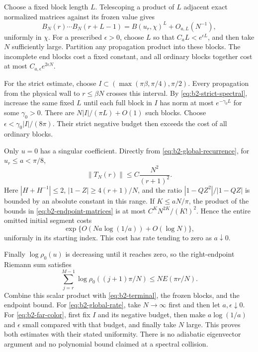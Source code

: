 Choose a fixed block length $L$. Telescoping a product of $L$
adjacent exact normalized matrices against its frozen value gives
\[
 B_N(r)\cdots B_N(r+L-1)
   =B(u_r,\chi)^L+O_{a,L}(N^{-1}),
\]
uniformly in $\chi$. For a prescribed $\epsilon>0$, choose $L$
so that $C_aL<e^{\epsilon L}$, and then take $N$ sufficiently
large. Partition any propagation product into these blocks.
The incomplete end blocks cost a fixed constant, and all ordinary
blocks together cost at most $C_{a,\epsilon}e^{2\epsilon N}$.

For the strict estimate, choose
$I\subset(\max(\pi\beta,\pi/4),\pi/2)$. Every propagation from
the physical wall to $r\le\beta N$ crosses this interval. By
\eqref{eq:b2-strict-spectral}, increase the same fixed $L$ until
each full block in $I$ has norm at most $e^{-\gamma_0L}$ for some
$\gamma_0>0$. There are $N|I|/(\pi L)+O(1)$ such blocks.
Choose $\epsilon<\gamma_0|I|/(8\pi)$. Their strict negative budget
then exceeds the cost of all ordinary blocks.

Only $u=0$ has a singular coefficient. Directly from
\eqref{eq:b2-global-recurrence}, for $u_r\le a<\pi/8$,
\begin{equation}\label{eq:b2-endpoint-matrices}
 \|T_N(r)\|\le C\frac{N^2}{(r+1)^2}.
\end{equation}
Here $|H+H^{-1}|\le2$, $|1-Z|\ge4(r+1)/N$, and the ratio
$|1-QZ^2|/|1-QZ|$ is bounded by an absolute constant in this
range. If $K\le aN/\pi$, the product of the bounds in
\eqref{eq:b2-endpoint-matrices} is at most
$C^KN^{2K}/(K!)^2$. Hence the entire omitted initial segment
costs
\[
 \exp\{O(Na\log(1/a))+O(\log N)\},
\]
uniformly in its starting index. This cost has rate tending to
zero as $a\downarrow0$.

Finally $\log\rho_0(u)$ is decreasing until it reaches zero, so
the right-endpoint Riemann sum satisfies
\begin{equation}\label{eq:b2-Riemann-envelope}
 \sum_{j=r}^{M-1}\log\rho_0((j+1)\pi/N)
       \le N E(\pi r/N).
\end{equation}
Combine this scalar product with \eqref{eq:b2-terminal}, the frozen
blocks, and the endpoint bound. For \eqref{eq:b2-global-rate},
take $N\to\infty$ first and then let $a,\epsilon\downarrow0$.
For \eqref{eq:b2-far-color}, first fix $I$ and its negative
budget, then make $a\log(1/a)$ and $\epsilon$ small compared with
that budget, and finally take $N$ large. This proves both estimates
with their stated uniformity. There is no adiabatic eigenvector
argument and no polynomial bound claimed at a spectral collision.

